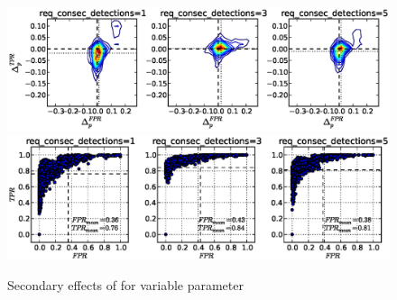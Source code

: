 \begin{figure}[!h]
\begin{center}
\includegraphics[width=6in]{../fig/final/delta_hist_sec/detection_window_hrs/req_consec_detections}
\includegraphics[width=5.5in]{../fig/final/position/all_allowed/detection_window_hrs/req_consec_detections}
\end{center}
\caption{\label{fig:sec} Secondary effects of  for variable
  parameter }
\end{figure}


